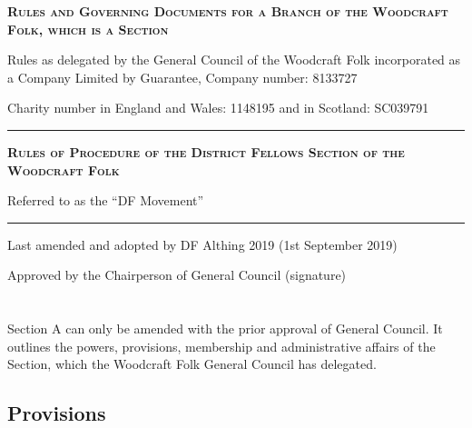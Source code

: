\documentclass[a4paper, 11pt]{report}
\newcommand{\HRule}{\rule{\linewidth}{0.5mm}}
\begin{document}
\begin{titlepage}
\begin{center}

\doublespacing
\vspace*{1cm}

\textsc{\textbf{ \LARGE Rules and Governing Documents for a Branch of the Woodcraft Folk, which is a Section }}

\vspace{1cm}

Rules as delegated by the General Council of the Woodcraft Folk incorporated as a Company Limited by Guarantee, Company number: 8133727

Charity number in England and Wales: 1148195 and in Scotland: SC039791

\vspace{1cm}

\HRule

\vspace{1.5cm}

\textsc{\textbf{\Large Rules of Procedure of the District Fellows Section of the Woodcraft Folk }}

Referred to as the ``DF Movement''

\vspace{1.5cm}

\HRule

\vspace{2cm}

Last amended and adopted by DF Althing 2019 (1st September 2019)

\vspace{0.5cm}

Approved by the Chairperson of General Council (signature) \underline{ \hspace{5cm} }

\end{center}
\end{titlepage}

\tableofcontents

\renewcommand{\chaptername}{Section}
\chapter{}
Section A can only be amended with the prior approval of General Council. It outlines the powers, provisions, membership and administrative affairs of the Section, which the Woodcraft Folk General Council has delegated.

\section{Provisions}
\label{sec:provisions}
\end{document}
